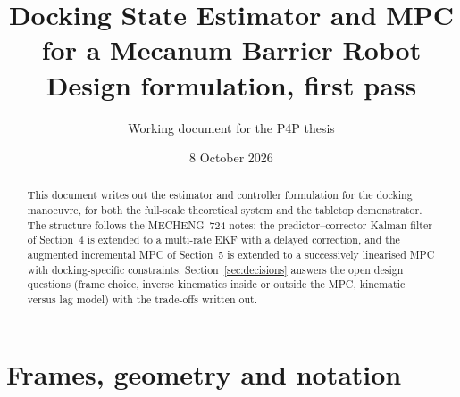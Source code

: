\documentclass[11pt,a4paper]{article}
\title{Docking State Estimator and MPC for a Mecanum Barrier Robot\\[4pt]
\large Design formulation, first pass}
\author{Working document for the P4P thesis}
\date{8 October 2026}
\begin{document}
\maketitle

\begin{abstract}
\noindent This document writes out the estimator and controller formulation for the docking manoeuvre, for both the full-scale theoretical system and the tabletop demonstrator. The structure follows the MECHENG~724 notes: the predictor--corrector Kalman filter of Section~4 is extended to a multi-rate EKF with a delayed correction, and the augmented incremental MPC of Section~5 is extended to a successively linearised MPC with docking-specific constraints. Section~\ref{sec:decisions} answers the open design questions (frame choice, inverse kinematics inside or outside the MPC, kinematic versus lag model) with the trade-offs written out.
\end{abstract}

\tableofcontents

\section{Frames, geometry and notation}
\label{sec:frames}
\end{document}
